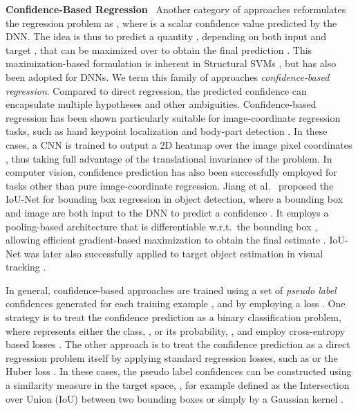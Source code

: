 \documentclass[runningheads]{llncs}
\newcommand{\parsection}[1]{\noindent\textbf{#1}~ }
\begin{document}
\parsection{Confidence-Based Regression}
Another category of approaches reformulates the regression problem as , where  is a scalar confidence value predicted by the DNN. The idea is thus to predict a quantity , depending on both input  and target , that can be maximized over  to obtain the final prediction . This maximization-based formulation is inherent in  Structural SVMs \cite{SSVM}, but has also been adopted for DNNs. We term this family of approaches \emph{confidence-based regression}. Compared to direct regression, the predicted confidence  can encapsulate multiple hypotheses and other ambiguities. Confidence-based regression has been shown particularly suitable for image-coordinate regression tasks, such as hand keypoint localization \cite{simonCVPR2017} and body-part detection \cite{convposeCVPR2016,deepcutCVPR2016,xiao2018simple}. In these cases, a CNN is trained to output a 2D heatmap over the image pixel coordinates , thus taking full advantage of the translational invariance of the problem. In computer vision, confidence prediction has also been successfully employed for tasks other than pure image-coordinate regression. Jiang et al.~\cite{jiang2018acquisition} proposed the IoU-Net for bounding box regression in object detection, where a bounding box  and image  are both input to the DNN to predict a confidence . It employs a pooling-based architecture that is differentiable w.r.t.\ the bounding box , allowing efficient gradient-based maximization to obtain the final estimate . IoU-Net was later also successfully applied to target object estimation in visual tracking \cite{danelljan2019atom}.

In general, confidence-based approaches are trained using a set of \emph{pseudo label} confidences  generated for each training example , and by employing a loss . One strategy \cite{deepcutCVPR2016,law2018cornernet} is to treat the confidence prediction as a binary classification problem, where  represents either the class, , or its probability, , and employ cross-entropy based losses . The other approach is to treat the confidence prediction as a direct regression problem itself by applying standard regression losses, such as  \cite{simonCVPR2017,danelljan2019atom,convposeCVPR2016} or the Huber loss \cite{jiang2018acquisition}. In these cases, the pseudo label confidences  can be constructed using a similarity measure  in the target space, , for example defined as the Intersection over Union (IoU) between two bounding boxes \cite{jiang2018acquisition} or simply by a Gaussian kernel \cite{convposeCVPR2016,xiao2018simple,sun2019deep}.  
\end{document}
